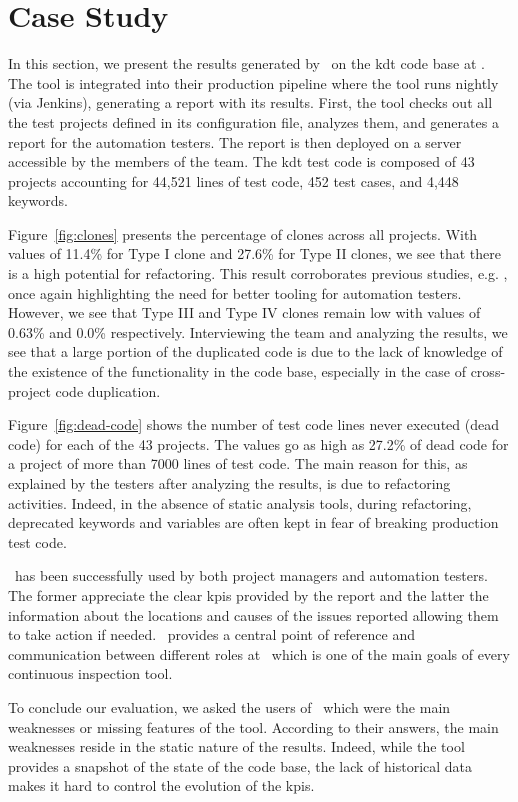 \section{Case Study}

In this section, we present the results generated by \tool~on the \gls{kdt} code base at \BGL. The tool is integrated into their production pipeline where the tool runs nightly (via Jenkins), generating a report with its results. First, the tool checks out all the test projects defined in its configuration file, analyzes them, and generates a report for the automation testers. The report is then deployed on a server accessible by the members of the team. The \gls{kdt} test code is composed of 43 projects accounting for 44,521 lines of test code, 452 test cases, and 4,448 keywords.

Figure~\ref{fig:clones} presents the percentage of clones across all projects. With values of 11.4\% for Type I clone and 27.6\% for Type II clones, we see that there is a high potential for refactoring. This result corroborates previous studies, e.g. \cite{Lavoie2017}, once again highlighting the need for better tooling for automation testers. However, we see that Type III and Type IV clones remain low with values of 0.63\% and 0.0\% respectively. Interviewing the team and analyzing the results, we see that a large portion of the duplicated code is due to the lack of knowledge of the existence of the functionality in the code base, especially in the case of cross-project code duplication.

Figure~\ref{fig:dead-code} shows the number of test code lines never executed (dead code) for each of the 43 projects. The values go as high as 27.2\% of dead code for a project of more than 7000 lines of test code. The main reason for this, as explained by the testers after analyzing the results, is due to refactoring activities. Indeed, in the absence of static analysis tools, during refactoring, deprecated keywords and variables are often kept in fear of breaking production test code.

\tool~has been successfully used by both project managers and automation testers. The former appreciate the clear \gls{kpi}s provided by the report and the latter the information about the locations and causes of the issues reported allowing them to take action if needed. \tool~provides a central point of reference and communication between different roles at \BGL~which is one of the main goals of every continuous inspection tool.

To conclude our evaluation, we asked the users of \tool~which were the main weaknesses or missing features of the tool. According to their answers, the main weaknesses reside in the static nature of the results. Indeed, while the tool provides a snapshot of the state of the code base, the lack of historical data makes it hard to control the evolution of the \gls{kpi}s.